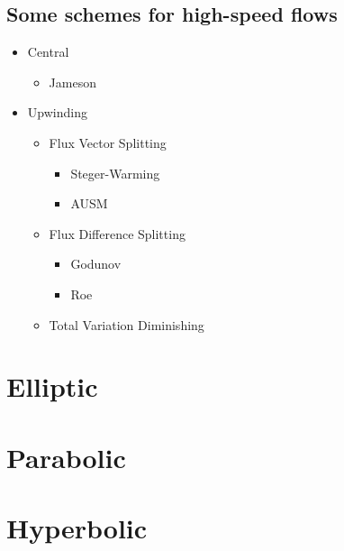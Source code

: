 \documentclass[oneside,a4paper,11pt]{report}
\begin{document}
\section{Some schemes for high-speed flows}
\begin{itemize}
    \item Central
    \begin{itemize}
        \item Jameson
    \end{itemize}
    \item Upwinding
    \begin{itemize}
        \item Flux Vector Splitting
        \begin{itemize}
             \item Steger-Warming
             \item AUSM
        \end{itemize}
        \item Flux Difference Splitting
        \begin{itemize}
            \item Godunov
            \item Roe
       \end{itemize}
        \item Total Variation Diminishing
    \end{itemize}
\end{itemize}

\chapter{Elliptic}

\chapter{Parabolic}

\chapter{Hyperbolic}
\end{document}
